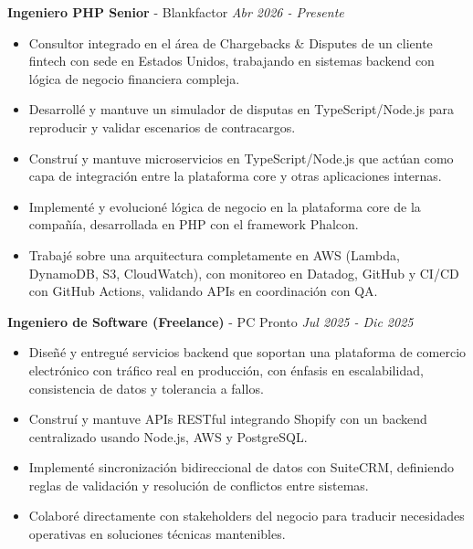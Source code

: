 \documentclass[9pt,letterpaper]{extarticle}
\begin{document}
	\textbf{Ingeniero PHP Senior} - {Blankfactor}
	\hfill \textit{Abr 2026 - Presente}
	\begin{itemize}
		\item Consultor integrado en el área de Chargebacks \& Disputes de un cliente fintech con sede en Estados Unidos, trabajando en sistemas backend con lógica de negocio financiera compleja.
		\item Desarrollé y mantuve un simulador de disputas en TypeScript/Node.js para reproducir y validar escenarios de contracargos.
		\item Construí y mantuve microservicios en TypeScript/Node.js que actúan como capa de integración entre la plataforma core y otras aplicaciones internas.
		\item Implementé y evolucioné lógica de negocio en la plataforma core de la compañía, desarrollada en PHP con el framework Phalcon.
		\item Trabajé sobre una arquitectura completamente en AWS (Lambda, DynamoDB, S3, CloudWatch), con monitoreo en Datadog, GitHub y CI/CD con GitHub Actions, validando APIs en coordinación con QA.
	\end{itemize}

	\textbf{Ingeniero de Software (Freelance)} - {PC Pronto}
	\hfill \textit{Jul 2025 - Dic 2025}
	\begin{itemize}
		\item Diseñé y entregué servicios backend que soportan una plataforma de comercio electrónico con tráfico real en producción, con énfasis en escalabilidad, consistencia de datos y tolerancia a fallos.
		\item Construí y mantuve APIs RESTful integrando Shopify con un backend centralizado usando Node.js, AWS y PostgreSQL.
		\item Implementé sincronización bidireccional de datos con SuiteCRM, definiendo reglas de validación y resolución de conflictos entre sistemas.
		\item Colaboré directamente con stakeholders del negocio para traducir necesidades operativas en soluciones técnicas mantenibles.
	\end{itemize}
	
\end{document}
